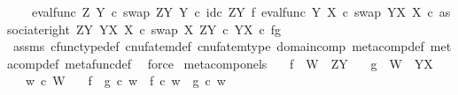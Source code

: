 \begin{isabellebody}
\ \ \ \ {\isacharparenleft}{\kern0pt}eval{\isacharunderscore}{\kern0pt}func\ Z\ Y\ {\isasymcirc}\isactrlsub c\ swap\ {\isacharparenleft}{\kern0pt}Z\isactrlbsup Y\isactrlesup {\isacharparenright}{\kern0pt}\ Y\ {\isasymcirc}\isactrlsub c\ {\isacharparenleft}{\kern0pt}id\isactrlsub c\ {\isacharparenleft}{\kern0pt}Z\isactrlbsup Y\isactrlesup {\isacharparenright}{\kern0pt}\ {\isasymtimes}\isactrlsub f\ eval{\isacharunderscore}{\kern0pt}func\ Y\ X\ {\isasymcirc}\isactrlsub c\ swap\ {\isacharparenleft}{\kern0pt}Y\isactrlbsup X\isactrlesup {\isacharparenright}{\kern0pt}\ X{\isacharparenright}{\kern0pt}\ {\isasymcirc}\isactrlsub c\ associate{\isacharunderscore}{\kern0pt}right\ {\isacharparenleft}{\kern0pt}Z\isactrlbsup Y\isactrlesup {\isacharparenright}{\kern0pt}\ {\isacharparenleft}{\kern0pt}Y\isactrlbsup X\isactrlesup {\isacharparenright}{\kern0pt}\ X\ {\isasymcirc}\isactrlsub c\ swap\ X\ {\isacharparenleft}{\kern0pt}Z\isactrlbsup Y\isactrlesup \ {\isasymtimes}\isactrlsub c\ Y\isactrlbsup X\isactrlesup {\isacharparenright}{\kern0pt}{\isacharparenright}{\kern0pt}\isactrlsup {\isasymsharp}\ {\isasymcirc}\isactrlsub c\ {\isasymlangle}f{\isacharcomma}{\kern0pt}g{\isasymrangle}{\isachardoublequoteclose}\isanewline
\ \ \ \ \isamarkupfalse%
\ assms\ cfunc{\isacharunderscore}{\kern0pt}type{\isacharunderscore}{\kern0pt}def\ cnufatem{\isacharunderscore}{\kern0pt}def{}\ cnufatem{\isacharunderscore}{\kern0pt}type\ domain{\isacharunderscore}{\kern0pt}comp\ meta{\isacharunderscore}{\kern0pt}comp{}{\isacharunderscore}{\kern0pt}def{}\ meta{\isacharunderscore}{\kern0pt}comp{}{\isacharunderscore}{\kern0pt}def{}\ metafunc{\isacharunderscore}{\kern0pt}def\ \isamarkupfalse%
\ force\isanewline
{}\isamarkupfalse%
%
\endisatagproof
{\isafoldproof}%
%
\isadelimproof
\isanewline
%
\endisadelimproof
\isanewline
{}\isamarkupfalse%
\ meta{\isacharunderscore}{\kern0pt}comp{\isacharunderscore}{\kern0pt}on{\isacharunderscore}{\kern0pt}els{\isacharcolon}{\kern0pt}\isanewline
\ \ \ {\isachardoublequoteopen}f\ {\isacharcolon}{\kern0pt}\ W\ {\isasymrightarrow}\ Z\isactrlbsup Y\isactrlesup {\isachardoublequoteclose}\isanewline
\ \ \ {\isachardoublequoteopen}g\ {\isacharcolon}{\kern0pt}\ W\ {\isasymrightarrow}\ Y\isactrlbsup X\isactrlesup {\isachardoublequoteclose}\isanewline
\ \ \ {\isachardoublequoteopen}w\ {\isasymin}\isactrlsub c\ W{\isachardoublequoteclose}\isanewline
\ \ \ {\isachardoublequoteopen}{\isacharparenleft}{\kern0pt}f\ {\isasymbox}\ g{\isacharparenright}{\kern0pt}\ {\isasymcirc}\isactrlsub c\ w\ {\isacharequal}{\kern0pt}\ {\isacharparenleft}{\kern0pt}f\ {\isasymcirc}\isactrlsub c\ w{\isacharparenright}{\kern0pt}\ {\isasymbox}\ {\isacharparenleft}{\kern0pt}g\ {\isasymcirc}\isactrlsub c\ w{\isacharparenright}{\kern0pt}{\isachardoublequoteclose}\isanewline

\end{isabellebody}
